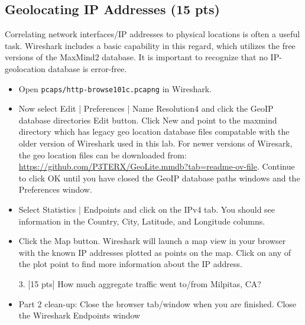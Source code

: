 \subsection{Geolocating IP Addresses (15 pts)}
Correlating network interfaces/IP addresses to physical locations is often a useful task. Wireshark
includes a basic capability in this regard, which utilizes the free versions of the MaxMind2
database. It is important to recognize that no IP-geolocation database is error-free.
\begin{itemize}
\item Open {\tt pcaps/http-browse101c.pcapng} in Wireshark.
\item Now select Edit | Preferences
| Name Resolution4 and click the GeoIP database directories Edit button. Click
New and point to the maxmind directory which has legacy geo location database files compatable
with the older version of Wireshark used in this lab.  For newer versions of Wiresark, the geo location
files can be downloaded from:
\url{https://github.com/P3TERX/GeoLite.mmdb?tab=readme-ov-file}. Continue to click OK until you have
closed the GeoIP database paths windows and the Preferences window.
\item Select Statistics | Endpoints and click on the IPv4 tab. You should see information
in the Country, City, Latitude, and Longitude columns.
\item Click the Map button. Wireshark will launch a map view in your browser with the
known IP addresses plotted as points on the map. Click on any of the plot point to
find more information about the IP address.
\item[3.] [15 pts] How much aggregate traffic went to/from Milpitas, CA?
\item Part 2 clean-up: Close the browser tab/window when you are finished. Close the
Wireshark Endpoints window
\end{itemize}

